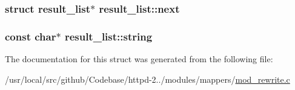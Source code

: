 \subsubsection[{\texorpdfstring{next}{next}}]{\setlength{\rightskip}{0pt plus 5cm}struct {\bf result\+\_\+list}$\ast$ result\+\_\+list\+::next}\hypertarget{structresult__list_ad0d01340209596dfd59262c83eb639b2}{}\label{structresult__list_ad0d01340209596dfd59262c83eb639b2}
\subsubsection[{\texorpdfstring{string}{string}}]{\setlength{\rightskip}{0pt plus 5cm}const char$\ast$ result\+\_\+list\+::string}\hypertarget{structresult__list_a8d69e645e5b5901338224d0209c3dd58}{}\label{structresult__list_a8d69e645e5b5901338224d0209c3dd58}


The documentation for this struct was generated from the following file\+:\begin{DoxyCompactItemize}
\item 
/usr/local/src/github/\+Codebase/httpd-\/2../modules/mappers/\hyperlink{mod__rewrite_8c}{mod\+\_\+rewrite.\+c}\end{DoxyCompactItemize}
